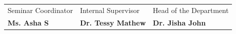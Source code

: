 


\begin{table}[htbp]
    \centering
    \renewcommand{\arraystretch}{1.5}
    \begin{tabular*}{\textwidth}{@{\extracolsep{\fill}}lll}
        Seminar Coordinator & Internal Supervisor & Head of the Department \\
        \textbf{Ms. Asha S} & \textbf{Dr. Tessy Mathew} & \textbf{Dr. Jisha John} \\
    \end{tabular*}
\end{table}  